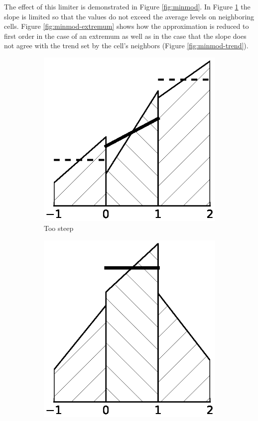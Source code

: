 The effect of this limiter is demonstrated in Figure \ref{fig:minmod}.
In Figure \ref{fig:minmod-steep} the slope is limited so that the values do not exceed the average levels on neighboring cells.
Figure \ref{fig:minmod-extremum} shows how the approximation is reduced to first order in the case of an extremum as well as in the case that the slope does not agree with the trend set by the cell's neighbors (Figure \ref{fig:minmod-trend}).
\begin{figure}
  \centering
  \begin{subfigure}{0.27\textwidth}
    \centering
    \includegraphics[width=\textwidth]{figures/minmod-a}
    \caption{Too steep}
    \label{fig:minmod-steep}
  \end{subfigure}
  \hfill
  \begin{subfigure}{0.27\textwidth}
    \centering
    \includegraphics[width=\textwidth]{figures/minmod-b}

\end{subfigure}
\end{figure}
